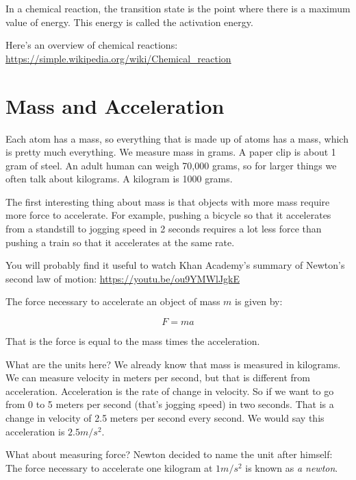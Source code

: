 In a chemical reaction, the transition state is the point where there is a maximum value of energy. This energy is called the activation energy. 

Here's an overview of chemical reactions: 
\url{https://simple.wikipedia.org/wiki/Chemical_reaction}


\section{Mass and Acceleration}

Each atom has a mass, so everything that is made up of atoms has a
mass, which is pretty much everything.  We measure mass in grams.  A
paper clip is about 1 gram of steel. An adult human can weigh 70,000
grams, so for larger things we often talk about kilograms. A kilogram
is 1000 grams.

The first interesting thing about mass is that objects with more mass
require more force to accelerate. For example, pushing a bicycle so
that it accelerates from a standstill to jogging speed in 2 seconds
requires a lot less force than pushing a train so that it accelerates
at the same rate.

You will probably find it useful to watch Khan Academy's summary of
Newton's second law of motion: \url{https://youtu.be/ou9YMWlJgkE}

\begin{mdframed}[style=important, frametitle={Newton's Second Law of Motion}]

The force necessary to accelerate an object of mass $m$ is given by:

$$F = m a$$

That is the force is equal to the mass times the acceleration.

\end{mdframed}

What are the units here? We already know that mass is measured in
kilograms. We can measure velocity in meters per second, but that is
different from acceleration. Acceleration is the rate of change in
velocity. So if we want to go from 0 to 5 meters per second (that's
jogging speed) in two seconds. That is a change in velocity of 2.5
meters per second every second. We would say this acceleration is $2.5
m/s^2$.

What about measuring force? Newton decided to name the unit after
himself: The force necessary to accelerate one kilogram at $1 m/s^2$
is known as \textit{a newton}.

